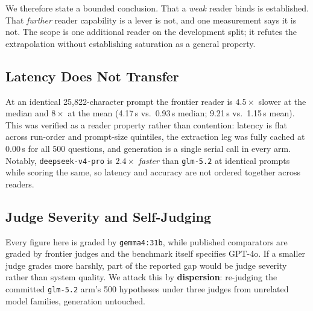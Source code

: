 \begin{table}[!htbp]
\centering
\caption{One rung of the reader ladder does not predict the next.}
\label{tab:saturation}
\end{table}

We therefore state a bounded conclusion. That a \emph{weak} reader binds is established. That \emph{further} reader capability is a lever is not, and one measurement says it is not. The scope is one additional reader on the development split; it refutes the extrapolation without establishing saturation as a general property.

\subsection{Latency Does Not Transfer}

At an identical 25{,}822-character prompt the frontier reader is $4.5\times$ slower at the median and $8\times$ at the mean (4.17\,s vs.\ 0.93\,s median; 9.21\,s vs.\ 1.15\,s mean). This was verified as a reader property rather than contention: latency is flat across run-order and prompt-size quintiles, the extraction leg was fully cached at 0.00\,s for all 500 questions, and generation is a single serial call in every arm. Notably, \texttt{deepseek-v4-pro} is $2.4\times$ \emph{faster} than \texttt{glm-5.2} at identical prompts while scoring the same, so latency and accuracy are not ordered together across readers.

\subsection{Judge Severity and Self-Judging}
\label{sec:judge}

Every figure here is graded by \texttt{gemma4:31b}, while published comparators are graded by frontier judges and the benchmark itself specifies GPT-4o. If a smaller judge grades more harshly, part of the reported gap would be judge severity rather than system quality. We attack this by \textbf{dispersion}: re-judging the committed \texttt{glm-5.2} arm's 500 hypotheses under three judges from unrelated model families, generation untouched.

